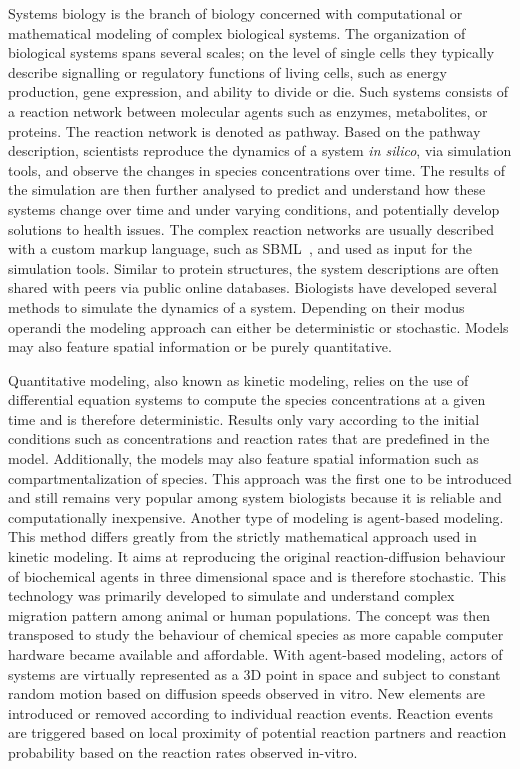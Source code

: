 Systems biology is the branch of biology concerned with computational or mathematical modeling of complex biological systems.
The organization of biological systems spans several scales; on the level of single cells they typically describe signalling or regulatory functions of living cells, such as energy production, gene expression, and ability to divide or die.
Such systems consists of a reaction network between molecular agents such as enzymes, metabolites, or proteins.
The reaction network is denoted as pathway.
Based on the pathway description, scientists reproduce the dynamics of a system \textit{in silico}, via simulation tools, and observe the changes in species concentrations over time.
The results of the simulation are then further analysed to predict and understand how these systems change over time and under varying conditions, and potentially develop solutions to health issues.
The complex reaction networks are usually described with a custom markup language, such as SBML~\cite{hucka2003systems}, and used as input for the simulation tools.
Similar to protein structures, the system descriptions are often shared with peers via public online databases.
Biologists have developed several methods to simulate the dynamics of a system.
Depending on their modus operandi the modeling approach can either be deterministic or stochastic.
Models may also feature spatial information or be purely quantitative. 

Quantitative modeling, also known as kinetic modeling, relies on the use of differential equation systems to compute the species concentrations at a given time and is therefore deterministic.
Results only vary according to the initial conditions such as concentrations and reaction rates that are predefined in the model.
Additionally, the models may also feature spatial information such as compartmentalization of species.
This approach was the first one to be introduced and still remains very popular among system biologists because it is reliable and computationally inexpensive.
Another type of modeling is agent-based modeling.
This method differs greatly from the strictly mathematical approach used in kinetic modeling.
It aims at reproducing the original reaction-diffusion behaviour of biochemical agents in three dimensional space and is therefore stochastic.
This technology was primarily developed to simulate and understand complex migration pattern among animal or human populations.
The concept was then transposed to study the behaviour of chemical species as more capable computer hardware became available and affordable.
With agent-based modeling, actors of systems are virtually represented as a 3D point in space and subject to constant random motion based on diffusion speeds observed in vitro.
New elements are introduced or removed according to individual reaction events.
Reaction events are triggered based on local proximity of potential reaction partners and reaction probability based on the reaction rates observed in-vitro.

